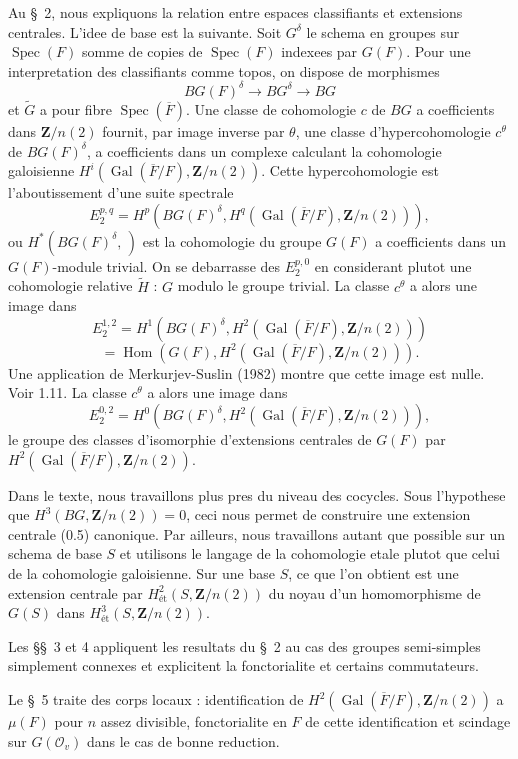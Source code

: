 \documentclass[11pt,a4paper]{article}
\theoremstyle{plain}
\theoremstyle{definition}
\DeclareMathOperator{\Gal}{Gal}
\DeclareMathOperator{\Spec}{Spec}
\DeclareMathOperator{\Hom}{Hom}
\newcommand{\et}{\text{\'et}}
\begin{document}
Au \S~2, nous expliquons la relation entre espaces classifiants et extensions centrales. L'idee de base est la suivante. Soit $G^\delta$ le schema en groupes sur $\Spec(F)$ somme de copies de $\Spec(F)$ indexees par $G(F)$. Pour une interpretation des classifiants comme topos, on dispose de morphismes
\[
BG(F)^\delta \to BG^\delta \to BG
\]
et $\widetilde{G}$ a pour fibre $\Spec(\overline{F})$. Une classe de cohomologie $c$ de $BG$ a coefficients dans $\mathbf{Z}/n(2)$ fournit, par image inverse par $\theta$, une classe d'hypercohomologie $c^\theta$ de $BG(F)^\delta$, a coefficients dans un complexe calculant la cohomologie galoisienne $H^i(\Gal(\overline{F}/F), \mathbf{Z}/n(2))$. Cette hypercohomologie est l'aboutissement d'une suite spectrale
\[
E_2^{p,q} = H^p(BG(F)^\delta, H^q(\Gal(\overline{F}/F), \mathbf{Z}/n(2))),
\]
ou $H^*(BG(F)^\delta, \,)$ est la cohomologie du groupe $G(F)$ a coefficients dans un $G(F)$-module trivial. On se debarrasse des $E_2^{p,0}$ en considerant plutot une cohomologie relative $\widetilde{H}$ : $G$ modulo le groupe trivial. La classe $c^\theta$ a alors une image dans
\[
E_2^{1,2} = H^1(BG(F)^\delta, H^2(\Gal(\overline{F}/F), \mathbf{Z}/n(2)))
\]
\[
= \Hom(G(F), H^2(\Gal(\overline{F}/F), \mathbf{Z}/n(2))).
\]
Une application de Merkurjev-Suslin (1982) montre que cette image est nulle. Voir 1.11. La classe $c^\theta$ a alors une image dans
\[
E_2^{0,2} = H^0(BG(F)^\delta, H^2(\Gal(\overline{F}/F), \mathbf{Z}/n(2))),
\]
le groupe des classes d'isomorphie d'extensions centrales de $G(F)$ par $H^2(\Gal(\overline{F}/F), \mathbf{Z}/n(2))$.

Dans le texte, nous travaillons plus pres du niveau des cocycles. Sous l'hypothese que $H^3(BG, \mathbf{Z}/n(2)) = 0$, ceci nous permet de construire une extension centrale (0.5) canonique. Par ailleurs, nous travaillons autant que possible sur un schema de base $S$ et utilisons le langage de la cohomologie etale plutot que celui de la cohomologie galoisienne. Sur une base $S$, ce que l'on obtient est une extension centrale par $H^2_\et(S, \mathbf{Z}/n(2))$ du noyau d'un homomorphisme de $G(S)$ dans $H^3_\et(S, \mathbf{Z}/n(2))$.

Les \S\S\ 3 et 4 appliquent les resultats du \S~2 au cas des groupes semi-simples simplement connexes et explicitent la fonctorialite et certains commutateurs.

Le \S~5 traite des corps locaux : identification de $H^2(\Gal(\overline{F}/F), \mathbf{Z}/n(2))$ a $\mu(F)$ pour $n$ assez divisible, fonctorialite en $F$ de cette identification et scindage sur $G(\mathcal{O}_v)$ dans le cas de bonne reduction.
\end{document}
